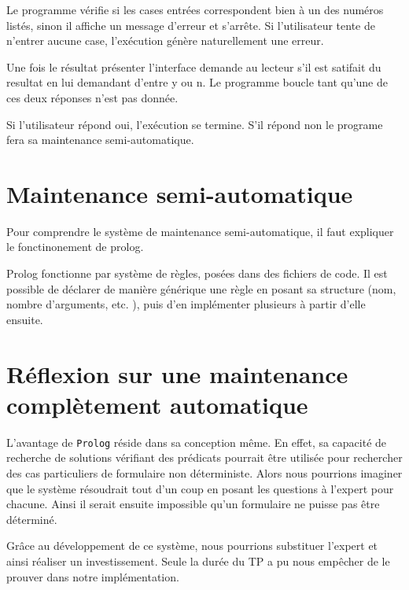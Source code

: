 Le programme vérifie si les cases entrées correspondent bien à un des numéros listés, sinon il affiche un message d'erreur et s'arrête.
Si l'utilisateur tente de n'entrer aucune case, l'exécution génère naturellement une erreur.

Une fois le résultat présenter l'interface demande au lecteur s'il est satifait du resultat en lui demandant d'entre y ou n. Le programme boucle tant qu'une de ces deux réponses n'est pas donnée.

Si l'utilisateur répond oui, l'exécution se termine. S'il répond non le programe fera sa maintenance semi-automatique.


\section{Maintenance semi-automatique}

Pour comprendre le système de maintenance semi-automatique, il faut expliquer le fonctinonement de prolog.

Prolog fonctionne par système de règles, posées dans des fichiers de code. Il est possible de déclarer de manière générique une règle en posant sa structure (nom, nombre d'arguments, etc. ), puis d'en implémenter plusieurs à partir d'elle ensuite.

\section{Réflexion sur une maintenance complètement automatique}

L'avantage de \texttt{Prolog} réside dans sa conception même. En effet, sa capacité de recherche de solutions vérifiant des prédicats
pourrait être utilisée pour rechercher des cas particuliers de formulaire non déterministe. Alors nous pourrions imaginer que le
système résoudrait tout d'un coup en posant les questions à l'expert pour chacune. Ainsi il serait ensuite impossible qu'un
formulaire ne puisse pas être déterminé.

Grâce au développement de ce système, nous pourrions substituer l'expert et ainsi réaliser un investissement. Seule la durée du TP a pu nous empêcher de le prouver dans notre
implémentation.

